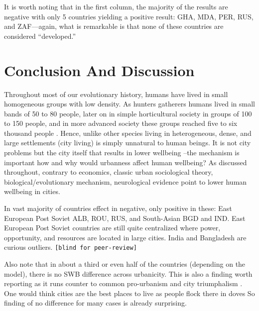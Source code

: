 \documentclass[10pt, letterpaper]{article}
\begin{document}
It is worth noting that in the first column, the majority of the results are
negative with only 5 countries yielding a positive result: GHA, MDA, PER, RUS, and ZAF---again, what is remarkable is that none of these countries are considered ``developed.''


\section*{Conclusion And Discussion}

Throughout most of our evolutionary history, humans have lived in small homogeneous groups with low density. As hunters gatherers humans lived in small bands of 50 to 80 people, later on in simple horticultural society in groups of 100 to 150 people, and in more advanced society these groups reached five to six thousand people \citep{maryanski92}. Hence, unlike other species %
living in heterogeneous, dense, and large settlements (city living) is simply unnatural to human beings.  
%
It is not city problems but the city itself that results in lower wellbeing
\citep{aok_brfss_city_cize16}--the mechanism is important how and why would
urbanness affect human wellbeing? As discussed throughout, contrary to economics, classic urban
sociological theory, biological/evolutionary mechanism, neurological evidence
point to lower human wellbeing in cities.

In vast majority of countries effect in negative, only positive in these:
East European Post Soviet ALB, ROU, RUS, and South-Asian BGD and IND.
East European Post Soviet countries are still quite centralized where power, opportunity, and resources are located in
large cities. %
India and Bangladesh are curious outliers. \texttt{[blind for
  peer-review]} %
%

Also note that in about a third or even half of the countries (depending on the
model), there is no SWB difference across urbanicity. This is also a finding
worth reporting as it runs counter to common pro-urbanism and city triumphalism
\citep[e.g.,][]{glaeser11}.
%
One would think cities are the best places to live as people flock there in doves
So finding of no difference for many cases is already surprising.
\end{document}

